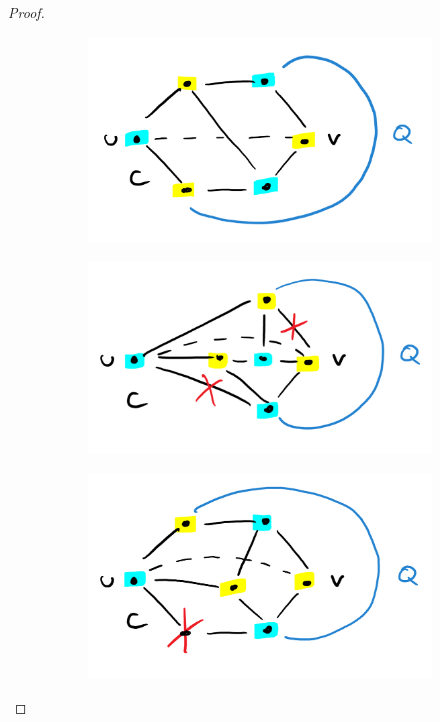 \begin{proof}
    \begin{figure}
        \centering
        \def\w{0.45\textwidth}
        \begin{subfigure}[c]{\w}
            \centering
            \includegraphics[width=\textwidth]{figures/kuratowski1.png}
            \label{fig:kuratowski-bsp1}
        \end{subfigure}
        \begin{subfigure}[c]{\w}
            \centering
            \includegraphics[width=\textwidth]{figures/kuratowski2.png}
            \label{fig:kuratowski-bsp2}
        \end{subfigure}
        \begin{subfigure}[c]{\w}
            \centering
            \includegraphics[width=\textwidth]{figures/kuratowski3.png}

\end{subfigure}
\end{figure}
\end{proof}
